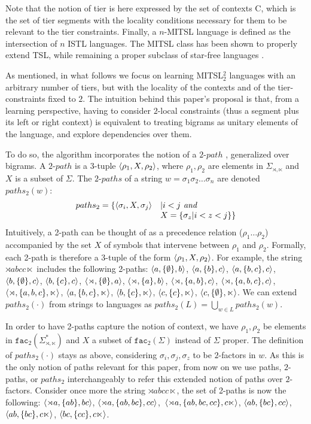 \documentclass[11pt,a4paper]{article}
\newcommand{\facn}[1]{\ensuremath{\texttt{fac}_{#1}}}
\begin{document}
Note that the notion of tier is here expressed by the set of contexts C, which is the set of tier segments with the locality conditions necessary for them to be relevant to the tier constraints.\@
Finally, a $n$-MITSL language is defined as the intersection of $n$ ISTL languages.\@
The MITSL class has been shown to properly extend TSL, while remaining a proper subclass of star-free languages \cite{desanto2019structure}.

As mentioned, in what follows we focus on learning MITSL$^2_2$ languages with an arbitrary number of tiers, but with the locality of the contexts and of the tier-constraints fixed to $2$.
The intuition behind this paper's proposal is that, from a learning perspective, having to consider $2$-local constraints (thus a segment plus its left or right context) is equivalent to treating bigrams as unitary elements of the language, and explore dependencies over them.

To do so, the algorithm incorporates the notion of a $2\text{-}path$ \citep{JardineHeinz16}, generalized over bigrams.
A $2\text{-}path$ is a $3$-tuple $\langle{\rho_1, X, \rho_2}\rangle$, where $\rho_1, \rho_2$  are elements in $\Sigma_{\rtimes,\ltimes}$ and $X$ is a subset of $\Sigma$.
The $2\text{-}paths$ of a string $w = \sigma_1\sigma_2\dots\sigma_n$ are denoted $paths_2(w)$:
$$
  \begin{array}{ll}
  paths_2= \{ \langle{\sigma_i,X,\sigma_j}\rangle & |  i < j  \textit{ and}\\
   & X = \{ \sigma_z | i < z<j\} \}
    \end{array}
$$
Intuitively, a 2-path can be thought of as a precedence relation ($\rho_1\ldots{}\rho_2$) accompanied by the set $X$ of symbols that intervene between $\rho_1$ and $\rho_2$.\@
 Formally, each 2-path is therefore a 3-tuple of the form $\langle{\rho_1, X, \rho_2}\rangle$.\@
 For example, the string $\rtimes abcc\ltimes$ includes the following 2-paths: 
$\langle{a, \{\emptyset\}, b}\rangle$, $\langle{a, \{b\}, c}\rangle$, $\langle{a, \{b,c\}, c}\rangle$, $\langle{b, \{\emptyset\}, c}\rangle$, $\langle{b, \{c\}, c}\rangle$, $\langle{\rtimes, \{\emptyset\}, a}\rangle$, $\langle{\rtimes, \{a\}, b}\rangle$,  $\langle{\rtimes, \{a,b\}, c}\rangle$, $ \langle{\rtimes,\{a,b,c\},c}\rangle$, $ \langle{\rtimes,\{a,b,c\},\ltimes}\rangle$, $\langle{a, \{b,c\}, \ltimes}\rangle$, $ \langle{b, \{c\}, \ltimes}\rangle$, $\langle{c, \{c\}, \ltimes}\rangle$, $ \langle{c, \{\emptyset\}, \ltimes}\rangle$.\@
We can extend  $paths_2(\cdot)$ from strings to languages as $paths_2(L) = \bigcup_{w \in L} paths_2(w)$.

In order to have 2-paths capture the notion of context, we  have   $\rho_1, \rho_2$ be elements in $ \facn{2}(\Sigma^*_{\rtimes,\ltimes})$ and $X$ a subset of $ \facn{2}(\Sigma)$ instead of $\Sigma$ proper.\@
The definition of $paths_2(\cdot)$ stays as above, considering $\sigma_i,\sigma_j,\sigma_z$ to be $2$-factors in $w$.\@
As this is the only notion of paths relevant for this paper, from now on we use paths, $2$-paths, or $paths_2$ interchangeably to refer this extended notion of paths over $2$-factors.
Consider once more the string $\rtimes abcc\ltimes$,  the set of  2-paths is now the following: 
$\langle{\rtimes a, \{ab\}, bc}\rangle$, $\langle{\rtimes a, \{ab,bc\}, cc}\rangle$,~$\langle{\rtimes a, \{ab,bc,cc\}, c\ltimes}\rangle$, $\langle{ab, \{bc\}, cc}\rangle$, $\langle{ab, \{bc\}, c\ltimes}\rangle$, $\langle{bc,  \{cc\}, c\ltimes}\rangle$.\@ 
\end{document}
